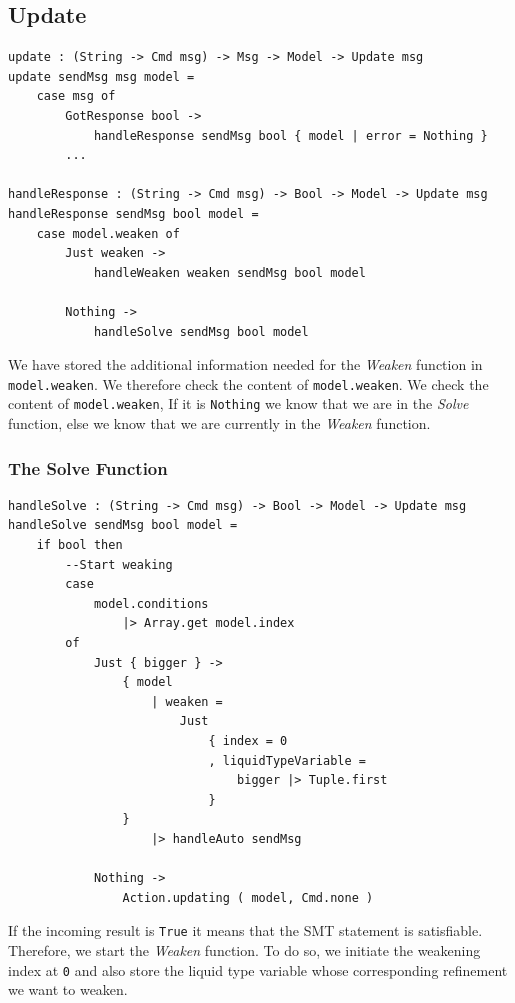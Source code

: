 \documentclass[]{scrbook}
\theoremstyle{definition}
\theoremstyle{definition}
\theoremstyle{definition}
\theoremstyle{remark}
\begin{document}
\subsection{Update}\label{update}

\begin{verbatim}
update : (String -> Cmd msg) -> Msg -> Model -> Update msg
update sendMsg msg model =
    case msg of
        GotResponse bool ->
            handleResponse sendMsg bool { model | error = Nothing }
        ...

handleResponse : (String -> Cmd msg) -> Bool -> Model -> Update msg
handleResponse sendMsg bool model =
    case model.weaken of
        Just weaken ->
            handleWeaken weaken sendMsg bool model

        Nothing ->
            handleSolve sendMsg bool model
\end{verbatim}

We have stored the additional information needed for the \emph{Weaken}
function in \texttt{model.weaken}. We therefore check the content of
\texttt{model.weaken}. We check the content of \texttt{model.weaken}, If
it is \texttt{Nothing} we know that we are in the \emph{Solve} function,
else we know that we are currently in the \emph{Weaken} function.

\subsubsection{The Solve Function}\label{the-solve-function}

\begin{verbatim}
handleSolve : (String -> Cmd msg) -> Bool -> Model -> Update msg
handleSolve sendMsg bool model =
    if bool then
        --Start weaking
        case
            model.conditions
                |> Array.get model.index
        of
            Just { bigger } ->
                { model
                    | weaken =
                        Just
                            { index = 0
                            , liquidTypeVariable = 
                                bigger |> Tuple.first
                            }
                }
                    |> handleAuto sendMsg

            Nothing ->
                Action.updating ( model, Cmd.none )
\end{verbatim}

If the incoming result is \texttt{True} it means that the SMT statement
is satisfiable. Therefore, we start the \emph{Weaken} function. To do
so, we initiate the weakening index at \texttt{0} and also store the
liquid type variable whose corresponding refinement we want to weaken.
\end{document}
